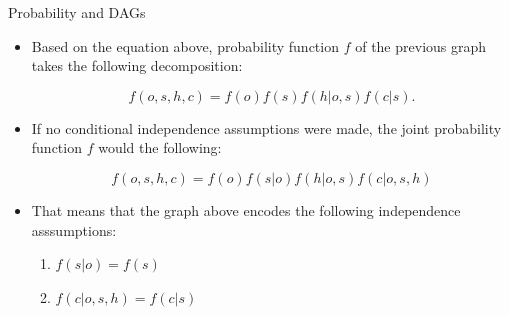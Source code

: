 \documentclass[handout]{beamer}
\begin{document}
\begin{frame}{Probability and DAGs}
\scriptsize{
\begin{itemize}



\item Based on the equation above, probability function $f$ of the previous graph takes the following decomposition:

\begin{displaymath}
f(o,s,h,c) = f(o)f(s)f(h|o,s)f(c|s).  
\end{displaymath}



\item If no conditional independence assumptions were made, the joint probability function $f$ would the following:

\begin{displaymath}
f(o,s,h,c) = f(o)f(s|o)f(h|o,s)f(c|o,s,h)
\end{displaymath}

\item That means that the graph above encodes the following independence asssumptions:

\begin{enumerate}
 \item $f(s|o) = f(s)$ 
 \item $f(c|o,s,h) = f(c|s)$   
\end{enumerate}



\end{itemize}



} 

\end{frame}
\end{document}

